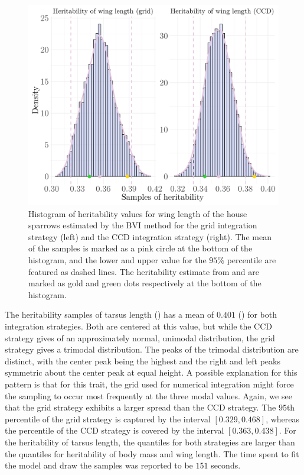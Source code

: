 \begin{figure}[H]
  \centering
  \includegraphics[width=1\linewidth]{Figures/House sparrow study/Heritability_wing_combined.png}
  \caption[Estimated heritability of wing length]{Histogram of heritability values for wing length of the house sparrows estimated by the BVI method for the grid integration strategy (left) and the CCD integration strategy (right). The mean of the samples is marked as a pink circle at the bottom of the histogram, and the lower and upper value for the $95\%$ percentile are featured as dashed lines. The heritability estimate from \citet{Silva2017} and \citet{Muff2019Genetic} are marked as gold and green dots respectively at the bottom of the histogram.}
  \label{fig:heritability_wing_combined}
\end{figure}
\noindent The heritability samples of tarsus length () has a mean of $0.401$ () for both integration strategies. Both are centered at this value, but while the CCD strategy gives of an approximately normal, unimodal distribution, the grid strategy gives a trimodal distribution. The peaks of the trimodal distribution are distinct, with the center peak being the highest and the right and left peaks symmetric about the center peak at equal height. A possible explanation for this pattern is that for this trait, the grid used for numerical integration might force the sampling to occur most frequently at the three modal values. Again, we see that the grid strategy exhibits a larger spread than the CCD strategy. The $95$th percentile of the grid strategy is captured by the interval $[0.329, 0.468]$, whereas the percentile of the CCD strategy is covered by the interval $[0.363, 0.438]$. For the heritability of tarsus length, the quantiles for both strategies are larger than the quantiles for heritability of body mass and wing length. The time spent to fit the model and draw the samples was reported to be $151$ seconds.  
